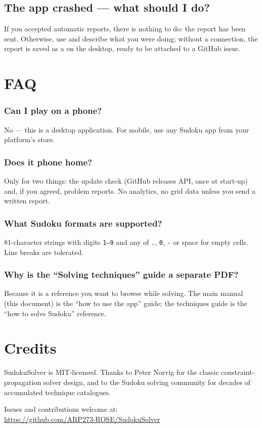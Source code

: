 \subsection{The app crashed --- what should I do?}

If you accepted automatic reports, there is nothing to do: the report has
been sent. Otherwise, use  and describe what
you were doing; without a connection, the report is saved as a 
on the desktop, ready to be attached to a GitHub issue.

\section{FAQ}

\subsubsection*{Can I play on a phone?}
No --- this is a desktop application. For mobile, use any Sudoku app
from your platform's store.

\subsubsection*{Does it phone home?}
Only for two things: the update check (GitHub releases API, once at
start-up) and, if you agreed, problem reports. No analytics, no grid data
unless you send a written report.

\subsubsection*{What Sudoku formats are supported?}
81-character strings with digits \texttt{1--9} and any of \texttt{.},
\texttt{0}, \texttt{-} or space for empty cells. Line breaks are
tolerated.

\subsubsection*{Why is the ``Solving techniques'' guide a separate PDF?}
Because it is a reference you want to browse while solving. The main
manual (this document) is the ``how to use the app'' guide; the
techniques guide is the ``how to solve Sudoku'' reference.

\section{Credits}

SudokuSolver is MIT-licensed. Thanks to Peter Norvig for the classic
constraint-propagation solver design, and to the Sudoku solving
community for decades of accumulated technique catalogues.

\medskip
Issues and contributions welcome at:\\
\url{https://github.com/ARP273-ROSE/SudokuSolver}

